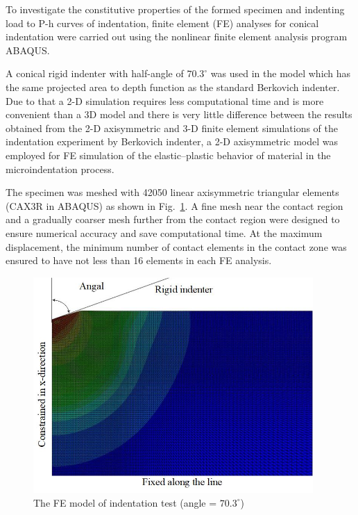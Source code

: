 \documentclass[review]{elsarticle}
\begin{document}
To investigate the constitutive properties of the formed specimen and indenting load to P-h curves of indentation, finite element (FE) analyses for conical indentation were carried out using the nonlinear finite element analysis program ABAQUS.

A conical rigid indenter with half-angle of $70.3^{\circ}$ was used in the model which has the same projected area to depth function as the standard Berkovich indenter. Due to that a 2-D simulation requires less computational time and is more convenient than a 3D model and there is very little difference between the results obtained from the 2-D axisymmetric and 3-D finite element simulations of the indentation experiment by Berkovich indenter, a 2-D axisymmetric model was employed for FE simulation of the elastic–plastic behavior of material in the microindentation process.

The specimen was meshed with 42050 linear axisymmetric triangular elements (CAX3R in ABAQUS) as shown in Fig.~\ref{fig:FEm}. A fine mesh near the contact region and a gradually coarser mesh further from the contact region were designed to ensure numerical accuracy and save computational time. At the maximum displacement, the minimum number of contact elements in the contact zone was ensured to have not less than 16 elements in each FE analysis.

\begin{figure}[h!]
\centering
\includegraphics[width=0.95\textwidth]{./figs/FEMindention.jpg}
\caption{The FE model of indentation test (angle = $70.3^{\circ}$)}
\label{fig:FEm}
\end{figure}
\end{document}
